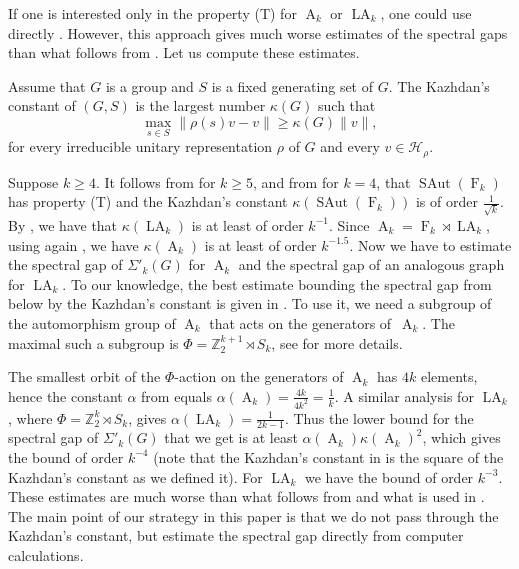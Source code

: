 \documentclass[12pt]{amsart}
\theoremstyle{definition}
\numberwithin{figure}{section}
\numberwithin{table}{section}
\numberwithin{equation}{section}
\newcommand{\OP}[1]{\operatorname{#1}}
\newcommand{\SAut}{\operatorname{SAut}}
\newcommand{\F}{\operatorname{F}}
\newcommand{\A}{\operatorname{A}}
\newcommand{\BB}[1]{{\mathbb #1}}
\begin{document}
If one is interested only in the property (T) for $\A_k$ or $\OP{LA}_k$, one could use directly \cite[Proposition 10]{MR4023374}. However, this approach gives much worse estimates of the spectral gaps than what follows from  . Let us compute these estimates. 

Assume that $G$ is a group and $S$ is a fixed generating set of $G$. The Kazhdan's constant of $(G,S)$ is the largest number $\kappa(G)$ such that 
$$
\max_{s\in S} \|\rho(s)v-v\| \geq \kappa(G)\|v\|,
$$
for every irreducible unitary representation $\rho$ of $G$ and every $v \in \mathcal{H}_\rho$. 

Suppose $k \geq 4$. It follows from \cite[Remark 5.11]{MR4224715} for $k\geq 5$, and from \cite{nitsche2022computerproofspropertyt} for $k=4$, that $\SAut(\F_k)$ has property (T) and the Kazhdan's constant $\kappa(\SAut(\F_k))$ is of order $\frac{1}{\sqrt{k}}$. By \cite[Proposition 10]{MR4023374}, we have that $\kappa(\OP{LA}_k)$ is at least of order $ k^{-1}$. Since $\A_k = \F_k \rtimes \OP{LA}_k$, using again \cite[Proposition 10]{MR4023374}, we have $\kappa(\A_k)$ is at least of order $k^{-1.5}$. Now we have to estimate the spectral gap of $\Sigma'_k(G)$ for $\A_k$ and the spectral gap of an analogous graph for $\OP{LA}_k$. To our knowledge, the best estimate bounding the spectral gap from below by the Kazhdan's constant is given in \cite{PakZuk}. To use it, we need a subgroup of the automorphism group of $\A_k$ that acts on the generators of~$\A_k$. The maximal such a subgroup is $\Phi = \BB Z_2^{k+1} \rtimes S_k$, see  for more details. 

The smallest orbit of the $\Phi$-action on the generators of $\A_k$ has $4k$ elements, hence the constant $\alpha$ from \cite{PakZuk} equals $\alpha(\A_k) = \frac{4k}{4k^2} = \frac{1}{k}$. A similar analysis for $\OP{LA}_k$, where $\Phi = \BB Z_2^k \rtimes S_k$, gives $\alpha(\OP{LA}_k) = \frac{1}{2k-1}$. Thus the lower bound for the spectral gap of $\Sigma'_k(G)$ that we get is at least $\alpha(\A_k)\kappa(\A_k)^2$, which gives the bound of order $k^{-4}$ (note that the Kazhdan's constant in \cite{PakZuk} is the square of the Kazhdan's constant as we defined it). For $\OP{LA}_k$ we have the bound of order $k^{-3}$. These estimates are much worse than what follows from  and what is used in . The main point of our strategy in this paper is that we do not pass through the Kazhdan's constant, but estimate the spectral gap directly from computer calculations. 
 
\end{document}
